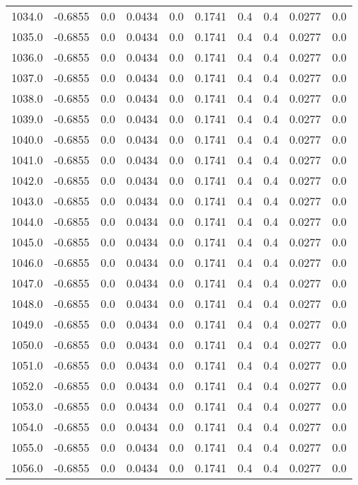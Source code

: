 \begin{longtable}{lrrrrrrrrr}
1034.0 & -0.6855 & 0.0 & 0.0434 & 0.0 & 0.1741 & 0.4 & 0.4 & 0.0277 & 0.0 \\
1035.0 & -0.6855 & 0.0 & 0.0434 & 0.0 & 0.1741 & 0.4 & 0.4 & 0.0277 & 0.0 \\
1036.0 & -0.6855 & 0.0 & 0.0434 & 0.0 & 0.1741 & 0.4 & 0.4 & 0.0277 & 0.0 \\
1037.0 & -0.6855 & 0.0 & 0.0434 & 0.0 & 0.1741 & 0.4 & 0.4 & 0.0277 & 0.0 \\
1038.0 & -0.6855 & 0.0 & 0.0434 & 0.0 & 0.1741 & 0.4 & 0.4 & 0.0277 & 0.0 \\
1039.0 & -0.6855 & 0.0 & 0.0434 & 0.0 & 0.1741 & 0.4 & 0.4 & 0.0277 & 0.0 \\
1040.0 & -0.6855 & 0.0 & 0.0434 & 0.0 & 0.1741 & 0.4 & 0.4 & 0.0277 & 0.0 \\
1041.0 & -0.6855 & 0.0 & 0.0434 & 0.0 & 0.1741 & 0.4 & 0.4 & 0.0277 & 0.0 \\
1042.0 & -0.6855 & 0.0 & 0.0434 & 0.0 & 0.1741 & 0.4 & 0.4 & 0.0277 & 0.0 \\
1043.0 & -0.6855 & 0.0 & 0.0434 & 0.0 & 0.1741 & 0.4 & 0.4 & 0.0277 & 0.0 \\
1044.0 & -0.6855 & 0.0 & 0.0434 & 0.0 & 0.1741 & 0.4 & 0.4 & 0.0277 & 0.0 \\
1045.0 & -0.6855 & 0.0 & 0.0434 & 0.0 & 0.1741 & 0.4 & 0.4 & 0.0277 & 0.0 \\
1046.0 & -0.6855 & 0.0 & 0.0434 & 0.0 & 0.1741 & 0.4 & 0.4 & 0.0277 & 0.0 \\
1047.0 & -0.6855 & 0.0 & 0.0434 & 0.0 & 0.1741 & 0.4 & 0.4 & 0.0277 & 0.0 \\
1048.0 & -0.6855 & 0.0 & 0.0434 & 0.0 & 0.1741 & 0.4 & 0.4 & 0.0277 & 0.0 \\
1049.0 & -0.6855 & 0.0 & 0.0434 & 0.0 & 0.1741 & 0.4 & 0.4 & 0.0277 & 0.0 \\
1050.0 & -0.6855 & 0.0 & 0.0434 & 0.0 & 0.1741 & 0.4 & 0.4 & 0.0277 & 0.0 \\
1051.0 & -0.6855 & 0.0 & 0.0434 & 0.0 & 0.1741 & 0.4 & 0.4 & 0.0277 & 0.0 \\
1052.0 & -0.6855 & 0.0 & 0.0434 & 0.0 & 0.1741 & 0.4 & 0.4 & 0.0277 & 0.0 \\
1053.0 & -0.6855 & 0.0 & 0.0434 & 0.0 & 0.1741 & 0.4 & 0.4 & 0.0277 & 0.0 \\
1054.0 & -0.6855 & 0.0 & 0.0434 & 0.0 & 0.1741 & 0.4 & 0.4 & 0.0277 & 0.0 \\
1055.0 & -0.6855 & 0.0 & 0.0434 & 0.0 & 0.1741 & 0.4 & 0.4 & 0.0277 & 0.0 \\
1056.0 & -0.6855 & 0.0 & 0.0434 & 0.0 & 0.1741 & 0.4 & 0.4 & 0.0277 & 0.0 \\

\end{longtable}
